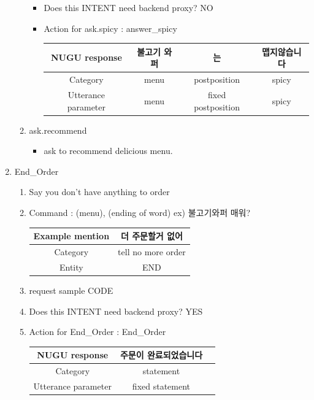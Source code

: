 \documentclass[conference,compsoc]{IEEEtran}
\begin{document}
\begin{enumerate}
\begin{enumerate}
\begin{itemize}
      \item Does this INTENT need backend proxy? NO
      \item Action for ask.spicy : answer\_spicy
      \begin{table}[h!] \renewcommand\arraystretch{1.75}
        \centering
          \begin{tabular}{@{}c | c c c @{}}
          \hline
          NUGU response & 불고기 와퍼 & 는  & 맵지않습니다 \\ 
          \hline
          Category        & menu   & postposition & spicy \\ 
          \hline
          Utterance parameter  & {{menu}}   & fixed postposition & {{spicy}} \\
          \hline
          \end{tabular}
      \end{table} 
      
    \end{itemize}

    \item ask.recommend
    \begin{itemize}
      \item ask to recommend delicious menu.
    \end{itemize}
  \end{enumerate}

  \item End\_Order
  \begin{enumerate}
    \item Say you don’t have anything to order
    \item Command : (menu), (ending of word) ex) 불고기와퍼 매워? 
    \begin{table}[h!] \renewcommand\arraystretch{1.25}
      \centering
        \begin{tabular}{@{}c | c  @{}}
        \hline
        Example mention & 더 주문할거 없어 \\ 
        \hline
        Category        & tell no more order \\ 
        \hline
        Entity  & END \\
        \hline
        \end{tabular}
    \end{table} 

    \item request sample
    CODE
    \item Does this INTENT need backend proxy? YES
    \item Action for End\_Order : End\_Order
    \begin{table}[h!] \renewcommand\arraystretch{1.25}
      \centering
        \begin{tabular}{@{}c | c c @{}}
        \hline
        NUGU response & 주문이 완료되었습니다 \\ 
        \hline
        Category        & statement \\ 
        \hline
        Utterance parameter  & fixed statement \\
        \hline
        \end{tabular}
    \end{table} 


\end{enumerate}
\end{enumerate}
\end{document}
